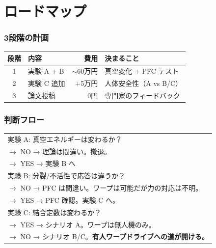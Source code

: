 \documentclass[12pt,a4paper]{article}
\begin{document}
\part{ロードマップ}

\section{3段階の計画}

\begin{center}
\renewcommand{\arraystretch}{1.4}
\begin{tabular}{clrl}
\toprule
段階 & 内容 & 費用 & 決まること \\
\midrule
1 & 実験 A + B & $\sim$60万円 & 真空変化 + PFC テスト \\
2 & 実験 C 追加 & $+$5万円 & 人体安全性（A vs B/C） \\
3 & 論文投稿 & 0円 & 専門家のフィードバック \\
\bottomrule
\end{tabular}
\end{center}

\section{判断フロー}

\begin{center}
\begin{tabular}{l}
実験 A: 真空エネルギーは変わるか？ \\
\quad $\to$ NO → 理論は間違い。撤退。 \\
\quad $\to$ YES → 実験 B へ \\[6pt]
実験 B: 分裂/不活性で応答は違うか？ \\
\quad $\to$ NO → PFC は間違い。ワープは可能だが力の対応は不明。 \\
\quad $\to$ YES → PFC 確認。実験 C へ。 \\[6pt]
実験 C: 結合定数は変わるか？ \\
\quad $\to$ YES → シナリオ A。ワープは無人機のみ。 \\
\quad $\to$ NO → シナリオ B/C。\textbf{有人ワープドライブへの道が開ける。} \\
\end{tabular}
\end{center}

\end{document}
